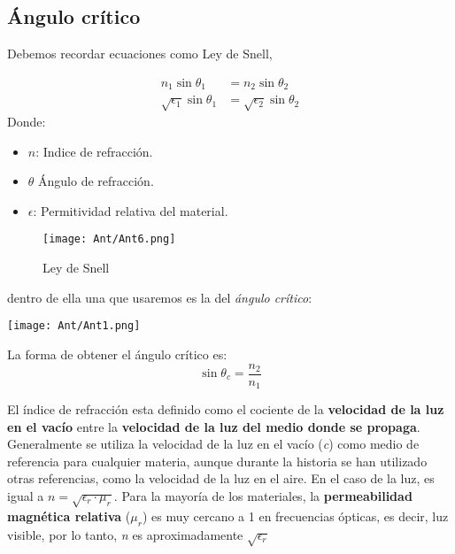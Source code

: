 \documentclass[
	12pt, %
	fleqn, %
	a4paper, %
	oneside, %
]{LegrandOrangeBook}
\begin{document}
\subsection{Ángulo crítico}
Debemos recordar ecuaciones como Ley de Snell,
\begin{definition}
\begin{align}
n_1\sin\theta_1&=n_2\sin\theta_2\\
\sqrt{\epsilon_1}\sin\theta_1&=\sqrt{\epsilon_2}\sin\theta_2
\label{eq:snell}
\end{align}
Donde:
\begin{itemize}
\item $n$: Indice de refracción.
\item $\theta$ Ángulo de refracción.
\item $\epsilon$: Permitividad relativa del material.
\end{itemize}
\end{definition}
\begin{figure}[H]
\centering
\texttt{[image: Ant/Ant6.png]}
\caption{Ley de Snell}
\end{figure}
dentro de ella una que usaremos es la del \textit{ángulo crítico}:
\begin{center}
\texttt{[image: Ant/Ant1.png]}
\end{center}
La forma de obtener el ángulo crítico es:
\begin{equation}
\sin\theta_c=\frac{n_2}{n_1}
\label{eq: angulo critico}
\end{equation}
\begin{notation}
El índice de refracción esta definido como el cociente de la \textbf{velocidad de la luz en el vacío} entre la \textbf{velocidad de la luz del medio donde se propaga}. Generalmente se utiliza la velocidad de la luz en el vacío (\textit{c}) como medio de referencia para cualquier materia, aunque durante la historia se han utilizado otras referencias, como la velocidad de la luz en el aire. En el caso de la luz, es igual a $n=\sqrt{\epsilon_r\cdot\mu_r}$. Para la mayoría de los materiales, la \textbf{permeabilidad magnética relativa} ($\mu_r$) es muy cercano a 1 en frecuencias ópticas, es decir, luz visible, por lo tanto, \textit{n} es aproximadamente $\sqrt{\epsilon_r}$
\end{notation}
\end{document}

